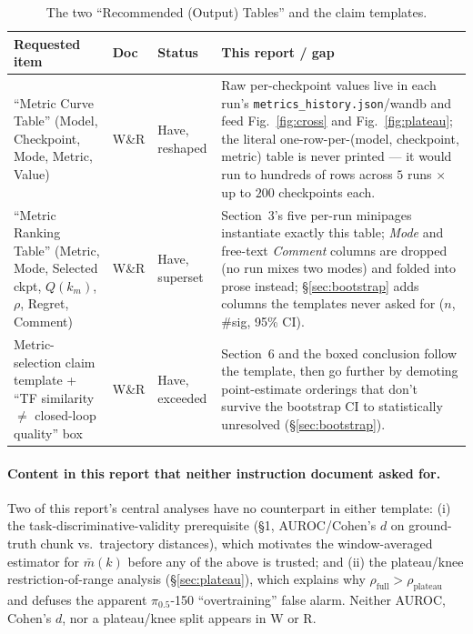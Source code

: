 \documentclass[11pt]{article}
\begin{document}
\begin{table}[h]
\centering
\footnotesize
\caption{The two ``Recommended (Output) Tables'' and the claim templates.}
\begin{tabular}{p{3.1cm}p{1.0cm}p{1.6cm}p{8.0cm}}
\toprule
Requested item & Doc & Status & This report / gap \\
\midrule
``Metric Curve Table'' (Model, Checkpoint, Mode, Metric, Value) & W\&R & Have, reshaped &
Raw per-checkpoint values live in each run's \texttt{metrics\_history.json}/wandb and feed
Fig.~\ref{fig:cross} and Fig.~\ref{fig:plateau}; the literal one-row-per-(model, checkpoint, metric)
table is never printed --- it would run to hundreds of rows across $5$ runs $\times$ up to $200$
checkpoints each. \\
``Metric Ranking Table'' (Metric, Mode, Selected ckpt, $Q(k_m)$, $\rho$, Regret, Comment) & W\&R &
Have, superset &
Section~3's five per-run minipages instantiate exactly this table; \emph{Mode} and free-text
\emph{Comment} columns are dropped (no run mixes two modes) and folded into prose instead;
\S\ref{sec:bootstrap} adds columns the templates never asked for ($n$, \#sig, 95\% CI). \\
Metric-selection claim template + ``TF similarity $\ne$ closed-loop quality'' box & W\&R & Have,
exceeded &
Section~6 and the boxed conclusion follow the template, then go further by demoting point-estimate
orderings that don't survive the bootstrap CI to statistically unresolved
(\S\ref{sec:bootstrap}). \\
\bottomrule
\end{tabular}
\end{table}

\paragraph{Content in this report that neither instruction document asked for.} Two of this report's
central analyses have no counterpart in either template: (i) the task-discriminative-validity
prerequisite (\S1, AUROC/Cohen's $d$ on ground-truth chunk vs.\ trajectory distances), which motivates
the window-averaged estimator for $\bar m(k)$ before any of the above is trusted; and (ii) the
plateau/knee restriction-of-range analysis (\S\ref{sec:plateau}), which explains why
$\rho_{\mathrm{full}}>\rho_{\mathrm{plateau}}$ and defuses the apparent $\pi_{0.5}$-150 ``overtraining''
false alarm. Neither AUROC, Cohen's $d$, nor a plateau/knee split appears in W or R.
\end{document}
